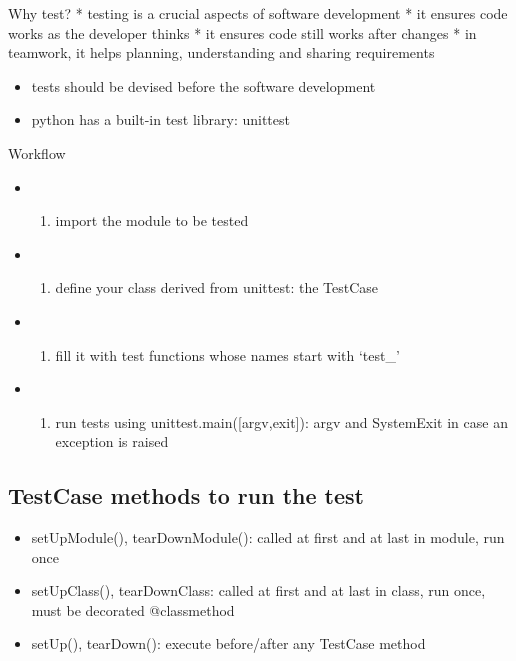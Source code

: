\documentclass[11pt]{article}
\providecommand{\tightlist}{%
      \setlength{\itemsep}{0pt}\setlength{\parskip}{0pt}}
\begin{document}
Why test? * testing is a crucial aspects of software development * it
ensures code works as the developer thinks * it ensures code still works
after changes * in teamwork, it helps planning, understanding and
sharing requirements

\begin{itemize}
\tightlist
\item
  tests should be devised before the software development
\item
  python has a built-in test library: unittest
\end{itemize}

Workflow

\begin{itemize}
\item
  \begin{enumerate}
  \def\labelenumi{\arabic{enumi})}
  \setcounter{enumi}{-1}
  \tightlist
  \item
    import the module to be tested
  \end{enumerate}
\item
  \begin{enumerate}
  \def\labelenumi{\arabic{enumi})}
  \tightlist
  \item
    define your class derived from unittest: the TestCase
  \end{enumerate}
\item
  \begin{enumerate}
  \def\labelenumi{\arabic{enumi})}
  \setcounter{enumi}{1}
  \tightlist
  \item
    fill it with test functions whose names start with `test\_'
  \end{enumerate}
\item
  \begin{enumerate}
  \def\labelenumi{\arabic{enumi})}
  \setcounter{enumi}{2}
  \tightlist
  \item
    run tests using unittest.main({[}argv,exit{]}): argv and SystemExit
    in case an exception is raised
  \end{enumerate}
\end{itemize}

    \hypertarget{testcase-methods-to-run-the-test}{%
\subsection{TestCase methods to run the
test}\label{testcase-methods-to-run-the-test}}

\begin{itemize}
\tightlist
\item
  setUpModule(), tearDownModule(): called at first and at last in
  module, run once
\item
  setUpClass(), tearDownClass: called at first and at last in class, run
  once, must be decorated @classmethod
\item
  setUp(), tearDown(): execute before/after any TestCase method
\end{itemize}
\end{document}
